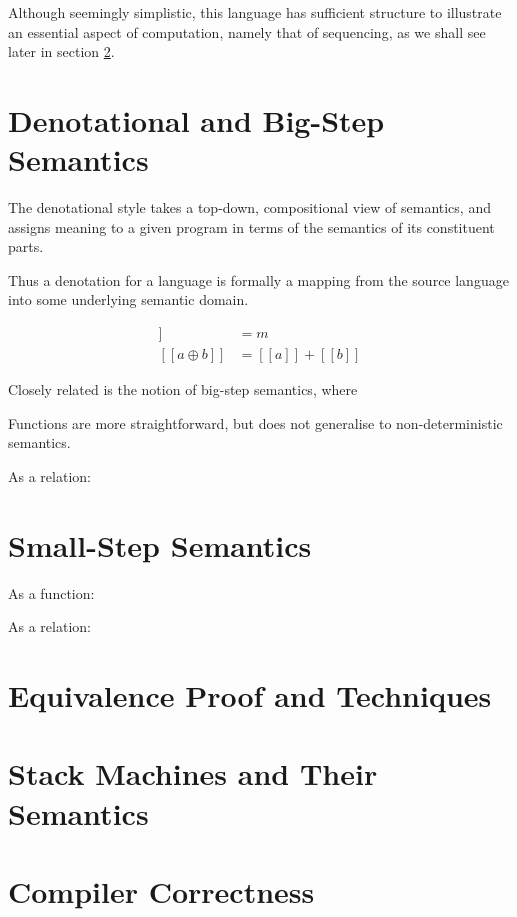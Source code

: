 Although seemingly simplistic, this language has sufficient structure to
illustrate an essential aspect of computation, namely that of sequencing, as
we shall see later in section \ref{sec:small-step}.


\section{Denotational and Big-Step Semantics}%

The denotational style takes a top-down, compositional view of semantics,
and assigns meaning to a given program in terms of the semantics of its
constituent parts. 

Thus a denotation for a language is formally a mapping from the source
language into some underlying semantic domain. 

\def\sb[#1]{[\![#1]\!]}

\begin{align*}
	\sb[ m ] &= m \\
	\sb[ a \oplus b ] &= \sb[ a ] + \sb[ b ]
\end{align*}





Closely related is the notion of big-step semantics, where 

Functions are more straightforward, but does not generalise to
non-deterministic semantics.

As a relation:


\section{Small-Step Semantics}\label{sec:small-step}%

As a function:

As a relation:


\section{Equivalence Proof and Techniques}%


\section{Stack Machines and Their Semantics}%


\section{Compiler Correctness}%



